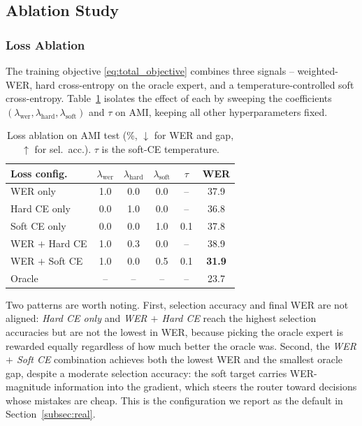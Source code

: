 \documentclass[journal]{IEEEtran}
\begin{document}
\subsection{Ablation Study}
\label{subsec:ablation}

\subsubsection{Loss Ablation}

The training objective \eqref{eq:total_objective} combines three
signals -- weighted-WER, hard cross-entropy on the oracle expert, and
a temperature-controlled soft cross-entropy. Table~\ref{tab:loss_ablation}
isolates the effect of each by sweeping the coefficients
$(\lambda_{\text{wer}},\lambda_{\text{hard}},\lambda_{\text{soft}})$
and $\tau$ on AMI, keeping all other hyperparameters fixed.

\begin{table}[t]
\centering
\caption{Loss ablation on AMI test (\%, $\downarrow$ for WER and gap,
$\uparrow$ for sel.\ acc.). $\tau$ is the soft-CE temperature.}
\label{tab:loss_ablation}
\small
\begin{tabular}{lccccc}
\toprule
Loss config. & $\lambda_{\text{wer}}$ & $\lambda_{\text{hard}}$ & $\lambda_{\text{soft}}$ & $\tau$ & WER\\
\midrule
WER only           & 1.0 & 0.0 & 0.0 & --   & 37.9 \\
Hard CE only       & 0.0 & 1.0 & 0.0 & --   & 36.8\\
Soft CE only       & 0.0 & 0.0 & 1.0 & 0.1 & 37.8\\
WER $+$ Hard CE
                   & 1.0 & 0.3 & 0.0 & --   & 38.9\\
WER $+$ Soft CE    & 1.0 & 0.0 & 0.5 & 0.1 & \textbf{31.9}\\
\midrule
Oracle             & --  & --  & --  & --  & 23.7\\
\bottomrule
\end{tabular}
\end{table}

Two patterns are worth noting. First, selection accuracy and final
WER are not aligned: \emph{Hard CE only} and \emph{WER $+$ Hard CE}
reach the highest selection accuracies but are not the lowest in
WER, because picking the oracle expert is rewarded equally
regardless of how much better the oracle was. Second, the
\emph{WER $+$ Soft CE} combination achieves both the lowest WER and
the smallest oracle gap, despite a moderate selection accuracy: the
soft target carries WER-magnitude information into the gradient,
which steers the router toward decisions whose mistakes are cheap.
This is the configuration we report as the default in
Section~\ref{subsec:real}.
\end{document}
